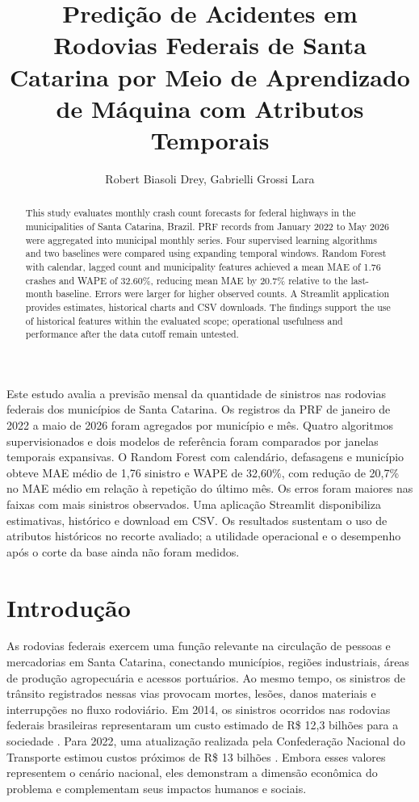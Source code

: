 \documentclass[12pt]{article}
\title{Predição de Acidentes em Rodovias Federais de Santa Catarina por Meio de Aprendizado de Máquina com Atributos Temporais}
\author{Robert Biasoli Drey\inst{1}, Gabrielli Grossi Lara\inst{1}}
\begin{document}
\maketitle

\begin{abstract}
This study evaluates monthly crash count forecasts for federal highways in the municipalities of Santa Catarina, Brazil. PRF records from January 2022 to May 2026 were aggregated into municipal monthly series. Four supervised learning algorithms and two baselines were compared using expanding temporal windows. Random Forest with calendar, lagged count and municipality features achieved a mean MAE of 1.76 crashes and WAPE of 32.60\%, reducing mean MAE by 20.7\% relative to the last-month baseline. Errors were larger for higher observed counts. A Streamlit application provides estimates, historical charts and CSV downloads. The findings support the use of historical features within the evaluated scope; operational usefulness and performance after the data cutoff remain untested.

\end{abstract}

\begin{resumo}
Este estudo avalia a previsão mensal da quantidade de sinistros nas rodovias federais dos municípios de Santa Catarina. Os registros da PRF de janeiro de 2022 a maio de 2026 foram agregados por município e mês. Quatro algoritmos supervisionados e dois modelos de referência foram comparados por janelas temporais expansivas. O Random Forest com calendário, defasagens e município obteve MAE médio de 1,76 sinistro e WAPE de 32,60\%, com redução de 20,7\% no MAE médio em relação à repetição do último mês. Os erros foram maiores nas faixas com mais sinistros observados. Uma aplicação Streamlit disponibiliza estimativas, histórico e download em CSV. Os resultados sustentam o uso de atributos históricos no recorte avaliado; a utilidade operacional e o desempenho após o corte da base ainda não foram medidos.

\end{resumo}

\section{Introdução}

As rodovias federais exercem uma função relevante na circulação de pessoas e mercadorias em Santa Catarina, conectando municípios, regiões industriais, áreas de produção agropecuária e acessos portuários. Ao mesmo tempo, os sinistros de trânsito registrados nessas vias provocam mortes, lesões, danos materiais e interrupções no fluxo rodoviário. Em 2014, os sinistros ocorridos nas rodovias federais brasileiras representaram um custo estimado de R\$ 12,3 bilhões para a sociedade \cite{ipea2015acidentes}. Para 2022, uma atualização realizada pela Confederação Nacional do Transporte estimou custos próximos de R\$ 13 bilhões \cite{cnt2023acidentes}. Embora esses valores representem o cenário nacional, eles demonstram a dimensão econômica do problema e complementam seus impactos humanos e sociais.
\end{document}
